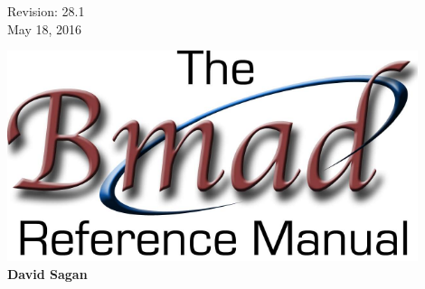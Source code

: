 
\thispagestyle{empty}

\begin{flushright}
\large
  Revision: 28.1 \\
  May 18, 2016 \\
\end{flushright}


\vfill

{
\begin{center}
\includegraphics[width=12cm]{bmad-ref-manual.pdf} \\
\vskip 0.3in
\huge\bf David Sagan
\end{center}
}

\vfill
\break

